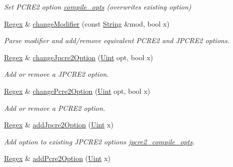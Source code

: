 \begin{DoxyCompactItemize}
\begin{DoxyCompactList}\small\item\em Set P\+C\+R\+E2 option \hyperlink{classjpcre2_1_1Regex_a5954131e9085de63229ed5c11417df69}{compile\+\_\+opts} (overwrites existing option) \end{DoxyCompactList}\item 
\hyperlink{classjpcre2_1_1Regex}{Regex} \& \hyperlink{classjpcre2_1_1Regex_abc4a13f1baa8f23a8747fb0ffd46a836}{change\+Modifier} (const \hyperlink{namespacejpcre2_a91f03070152fb228bc116c5a737f1d16}{String} \&mod, bool x)
\begin{DoxyCompactList}\small\item\em Parse modifier and add/remove equivalent P\+C\+R\+E2 and J\+P\+C\+R\+E2 options. \end{DoxyCompactList}\item 
\hyperlink{classjpcre2_1_1Regex}{Regex} \& \hyperlink{classjpcre2_1_1Regex_ab8e0b1a49eeb1077ba54cf3b5292c95e}{change\+Jpcre2\+Option} (\hyperlink{namespacejpcre2_a078242d38221a13fb3543b9edd78c099}{Uint} opt, bool x)
\begin{DoxyCompactList}\small\item\em Add or remove a J\+P\+C\+R\+E2 option. \end{DoxyCompactList}\item 
\hyperlink{classjpcre2_1_1Regex}{Regex} \& \hyperlink{classjpcre2_1_1Regex_ae5bde8008cc5a700163ca3162dbd5823}{change\+Pcre2\+Option} (\hyperlink{namespacejpcre2_a078242d38221a13fb3543b9edd78c099}{Uint} opt, bool x)
\begin{DoxyCompactList}\small\item\em Add or remove a P\+C\+R\+E2 option. \end{DoxyCompactList}\item 
\hyperlink{classjpcre2_1_1Regex}{Regex} \& \hyperlink{classjpcre2_1_1Regex_a03974fa7ba8f7c47186cb8d6f54934de}{add\+Jpcre2\+Option} (\hyperlink{namespacejpcre2_a078242d38221a13fb3543b9edd78c099}{Uint} x)
\begin{DoxyCompactList}\small\item\em Add option to existing J\+P\+C\+R\+E2 options \hyperlink{classjpcre2_1_1Regex_abdd26c3bc1c3132f0aa73dde1690a7ef}{jpcre2\+\_\+compile\+\_\+opts}. \end{DoxyCompactList}\item 
\hyperlink{classjpcre2_1_1Regex}{Regex} \& \hyperlink{classjpcre2_1_1Regex_a2c7dcf12f26b2b046e147b013c8b5087}{add\+Pcre2\+Option} (\hyperlink{namespacejpcre2_a078242d38221a13fb3543b9edd78c099}{Uint} x)

\end{DoxyCompactItemize}
